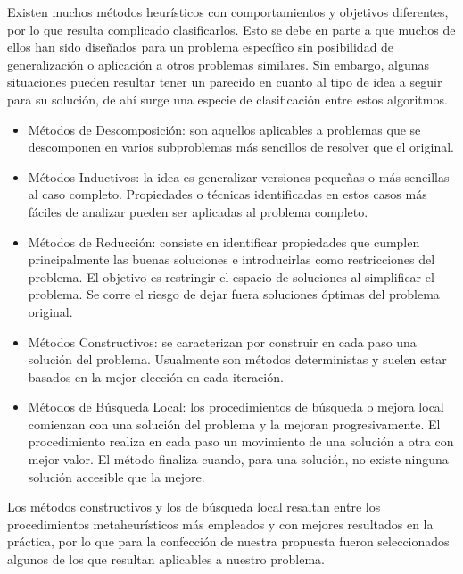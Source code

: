 \documentclass[a4paper,12pt]{book}
\begin{document}
	Existen muchos métodos heurísticos con comportamientos y objetivos diferentes, por lo que resulta complicado clasificarlos. Esto se debe en parte a que muchos de  ellos  han  sido  diseñados para un problema específico sin posibilidad de generalización o aplicación a otros problemas similares. Sin embargo, algunas situaciones pueden resultar tener un parecido en cuanto al tipo de idea a seguir para su solución, de ahí surge una especie de clasificación entre estos algoritmos.
	
	\begin{itemize}
		\item Métodos de Descomposición: son aquellos aplicables a problemas que se descomponen en varios subproblemas más sencillos de resolver que el original.
		
		\item Métodos Inductivos: la idea es generalizar versiones pequeñas o más sencillas al caso completo. Propiedades o técnicas identificadas en estos casos más fáciles de analizar pueden ser aplicadas al problema completo.
		
		\item Métodos de Reducción: consiste en identificar propiedades que cumplen principalmente las buenas soluciones e introducirlas como restricciones del problema.  El objetivo es restringir el espacio de soluciones al simplificar el problema. Se corre el riesgo de dejar fuera soluciones óptimas del problema original.
		
		\item Métodos Constructivos: se caracterizan por construir en cada paso una solución del problema. Usualmente son  métodos deterministas y suelen estar basados en la mejor elección en cada iteración.
		
		\item Métodos de Búsqueda Local: los  procedimientos  de  búsqueda o mejora local comienzan con una solución del problema y la mejoran progresivamente.  El procedimiento realiza en cada paso un movimiento de una solución a otra con mejor valor. El método finaliza cuando, para una solución, no existe ninguna solución accesible que la mejore.	\end{itemize}
	
		Los métodos constructivos y los de búsqueda local resaltan entre los procedimientos metaheurísticos más empleados y con mejores resultados en la práctica, por lo que para la confección de nuestra propuesta fueron seleccionados algunos de los que resultan aplicables a nuestro problema. 
	
\end{document}
